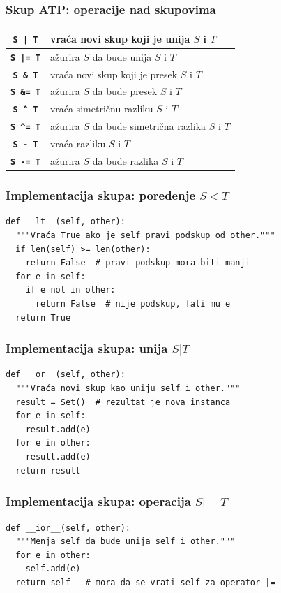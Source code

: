 \documentclass[compress]{beamer}
\begin{document}
\begin{frame}[fragile]
  \frametitle{Skup ATP: operacije nad skupovima}
  \begin{center}
    \begin{tabular}{cp{8.5cm}}
      \textbf{\texttt{S | T}} & vraća novi skup koji je unija $S$ i $T$ \\ \hline
      \textbf{\texttt{S |= T}} & ažurira $S$ da bude unija $S$ i $T$ \\ \hline
      \textbf{\texttt{S \& T}} & vraća novi skup koji je presek $S$ i $T$ \\ \hline
      \textbf{\texttt{S \&= T}} & ažurira $S$ da bude presek $S$ i $T$ \\ \hline
      \textbf{\texttt{S \^{} T}} & vraća simetričnu razliku $S$ i $T$ \\ \hline
      \textbf{\texttt{S \^{}= T}} & ažurira $S$ da bude simetrična razlika $S$ i $T$ \\ \hline
      \textbf{\texttt{S - T}} & vraća razliku $S$ i $T$ \\ \hline
      \textbf{\texttt{S -= T}} & ažurira $S$ da bude razlika $S$ i $T$ \\
    \end{tabular}
  \end{center}
\end{frame}

\begin{frame}
  \frametitle{Implementacija skupa: poređenje $S < T$}
\begin{verbatim}
def __lt__(self, other):
  """Vraća True ako je self pravi podskup od other."""
  if len(self) >= len(other):
    return False  # pravi podskup mora biti manji
  for e in self:
    if e not in other:
      return False  # nije podskup, fali mu e
  return True
  \end{verbatim}
\end{frame}

\begin{frame}
  \frametitle{Implementacija skupa: unija $S | T$}
\begin{verbatim}
def __or__(self, other):
  """Vraća novi skup kao uniju self i other."""
  result = Set()  # rezultat je nova instanca
  for e in self:
    result.add(e)
  for e in other:
    result.add(e)
  return result
\end{verbatim}
\end{frame}

\begin{frame}
  \frametitle{Implementacija skupa: operacija $S |= T$}
\begin{verbatim}
def __ior__(self, other):
  """Menja self da bude unija self i other."""
  for e in other:
    self.add(e)
  return self   # mora da se vrati self za operator |=
\end{verbatim}
\end{frame}
\end{document}

